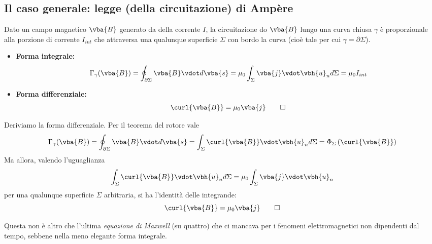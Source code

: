 \subsection{Il caso generale: legge (della circuitazione) di Ampère}
\begin{theorema}
	Dato un campo magnetico $\vba{B}$ generato da della corrente $I$, la circuitazione do $\vba{B}$ lungo una curva chiusa $\gamma$ è proporzionale alla porzione di corrente $I_{int}$ che attraversa una qualunque superficie $\Sigma$ con bordo la curva (cioè tale per cui $\gamma=\partial\Sigma$).
	\begin{itemize}
		\item \textbf{Forma integrale:}
		\begin{equation}
			\Gamma_{\gamma}(\vba{B})=\oint_{\partial \Sigma} \vba{B}\vdot d\vba{s}=\mu_0\int_{\Sigma}\vba{j}\vdot\vbh{u}_nd\Sigma=\mu_0 I_{int}\label{LeggeAmpereMagnetostaticaIntegrale}
		\end{equation}
		\item \textbf{Forma differenziale:}
		\begin{equation}
			\curl{\vba{B}}=\mu_0\vba{j}\label{LeggeAmpereMagnetostaticaDifferenziale}\qedhere
		\end{equation}
	\end{itemize}
\end{theorema}
\begin{demonstration}
	Deriviamo la forma differenziale. Per il teorema del rotore vale
	\begin{equation*}
		\Gamma_{\gamma}(\vba{B})=\oint_{\partial \Sigma} \vba{B}\vdot d\vba{s}=\int_{\Sigma}\curl{\vba{B}}\vdot\vbh{u}_nd\Sigma=\Phi_{\Sigma}\left(\curl{\vba{B}}\right)
	\end{equation*}
	Ma allora, valendo l'uguaglianza
	\begin{equation*}
		\int_{\Sigma}\curl{\vba{B}}\vdot\vbh{u}_nd\Sigma=\mu_0\int_{\Sigma}\vba{j}\vdot\vbh{u}_n
	\end{equation*}
	per una qualunque superficie $\Sigma$ arbitraria, si ha l'identità delle integrande:
	\begin{equation*}
		\curl{\vba{B}}=\mu_0\vba{j}\qedhere
	\end{equation*}
\end{demonstration}
Questa non è altro che l'ultima \textit{equazione di Maxwell} (su quattro) che ci mancava per i fenomeni elettromagnetici non dipendenti dal tempo, sebbene nella meno elegante forma integrale.

